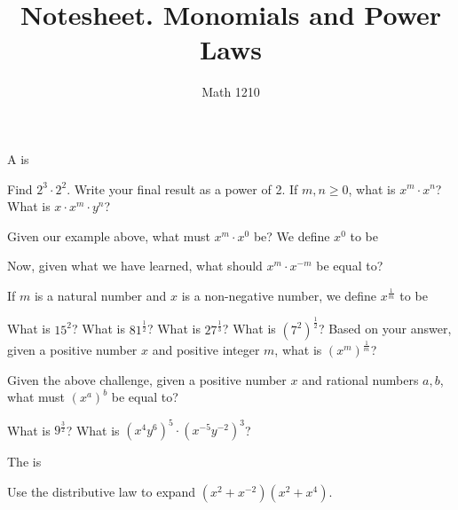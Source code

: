 \documentclass[12pt, a4paper]{article}
\author{Math 1210}
\title{Notesheet. Monomials and Power Laws}
\date{}
\begin{document}
\maketitle
\nameline
\begin{defi}
  A  is
\end{defi}
\begin{ex}
  Find \(2^3 \cdot 2^2\). Write your final result as a power of 2. If
  \(m,n \geq 0\), what is \(x^m \cdot x^n\)? What is \(x \cdot x^m
  \cdot y^n\)?
\end{ex}
\begin{defi}
  Given our example above, what must \(x^m \cdot x^0\) be? We define
  \(x^0\) to be
\end{defi}
\begin{ex}
  Now, given what we have learned, what should \(x^m \cdot x^{-m}\) be
  equal to?
\end{ex}
\begin{defi}
  If \(m\) is a natural number and \(x\) is a non-negative number, we
  define \(x^{\frac{1}{m}}\) to be
\end{defi}
\begin{ex}
  What is \(15^2\)? What is \(81^{\frac{1}{2}}\)? What is
  \(27^{\frac{1}{3}}\)? What is
  \((7^2)^{\frac{1}{2}}\)? Based on your answer, given a positive
  number \(x\) and positive integer \(m\), what is
  \((x^m)^{\frac{1}{m}}\)?
\end{ex}
\begin{defi}
  Given the above challenge, given a positive number \(x\) and
  rational numbers \(a,b\), what must \((x^a)^b\) be equal to?
\end{defi}
\begin{ex}
  What is \(9^{\frac{3}{2}}\)? What is \((x^4y^6)^5 \cdot
  (x^{-5}y^{-2})^{3}\)?
\end{ex}
\begin{defi}
  The  is
\end{defi}
\begin{ex}
  Use the distributive law to expand \((x^2+x^{-2})(x^2+x^4)\).
\end{ex}
\end{document}
